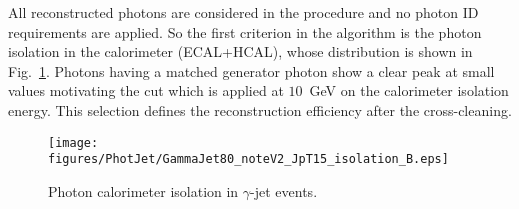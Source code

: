 \documentclass{cmspaper}
\begin{document}
All reconstructed photons are considered in the procedure and no
photon ID requirements are applied. So the first criterion in the algorithm is
the photon isolation in the calorimeter (ECAL+HCAL), whose distribution is
shown in Fig.~\ref{fig:pjPhotIso}. Photons having a matched generator photon
show a clear peak at small values motivating the cut which is applied at
$10$~GeV on the calorimeter isolation energy.
This selection defines the reconstruction efficiency after the cross-cleaning.
\begin{figure}[hbtp]
  \begin{center}
    \texttt{[image: figures/PhotJet/GammaJet80\_noteV2\_JpT15\_isolation\_B.eps]}
    \caption{Photon calorimeter isolation in $\gamma$-jet events.}
    \label{fig:pjPhotIso}
  \end{center}
\end{figure}
\end{document}

